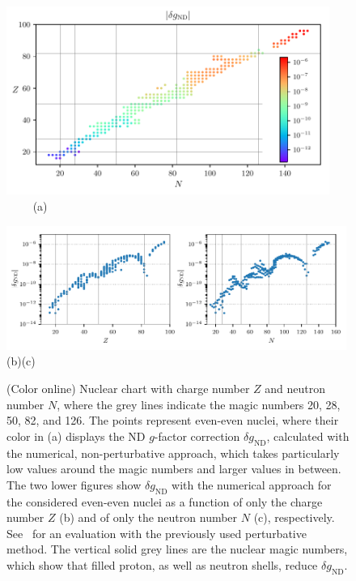 \begin{figure}
  \centering
  \begin{minipage}[b]{\textwidth}
    \centering
    \includegraphics[width=0.94\textwidth]{pics/dgnuclchart.pdf}\\
    $\qquad \, \,$(a)
  \end{minipage}
  \hfill
  \begin{minipage}[b]{\textwidth}
     \centering
    \includegraphics[width=0.99\textwidth]{pics/dgZN.pdf}\\
    \hspace{1.3cm}(b)\hspace{6.7cm}(c)
    \caption{\label{fig:dg}(Color online) Nuclear chart with charge number $Z$ and neutron number $N$, where the grey lines indicate the magic numbers 20, 28, 50, 82, and 126. The points represent even-even nuclei, where their color in (a) displays the ND $g$-factor correction $\delta g_{\text{ND}}$, calculated with the numerical, non-perturbative approach, which takes particularly low values around the magic numbers and larger values in between. The two lower figures show $\delta g_{\text{ND}}$ with the numerical approach for the considered even-even nuclei as a function of only the charge number $Z$ (b) and of only the neutron number $N$ (c), respectively. See~\cite{michel2015} for an evaluation with the previously used perturbative method. The vertical solid grey lines are the nuclear magic numbers, which show that filled proton, as well as neutron shells, reduce $\delta g_{\text{ND}}$.}
  \end{minipage}
\end{figure}

